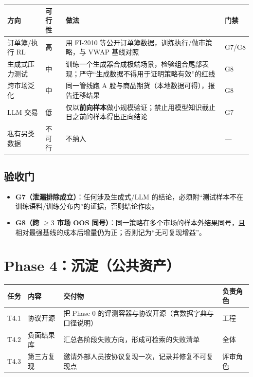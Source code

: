 \documentclass[11pt,a4paper]{ctexart}
\begin{document}
\begin{longtable}{@{}>{\raggedright\arraybackslash}p{3.0cm}>{\raggedright\arraybackslash}p{1.6cm}>{\raggedright\arraybackslash}p{7.2cm}>{\raggedright\arraybackslash}p{1.9cm}@{}}
\toprule
方向 & 可行性 & 做法 & 门禁 \\
\midrule
\endhead
订单簿/执行 RL & 高 & 用 FI-2010 等公开订单簿数据，训练执行/做市策略，与 VWAP 基线对照 & G7/G8 \\
生成式压力测试 & 中 & 训练一个生成器合成极端场景，检验组合尾部表现；严守“生成数据不得用于证明策略有效”的红线 & G8 \\
跨市场泛化 & 中 & 同一管线跑 A 股与商品期货（本地数据可得），报告迁移结果 & G8 \\
LLM 交易 & 低 & 仅以\textbf{前向样本}做小规模验证；禁止用模型知识截止日之前的样本得出正向结论 & G7 \\
私有另类数据 & 不可行 & 不纳入 & — \\
\bottomrule
\end{longtable}

\subsection{验收门}

\begin{itemize}
  \item \textbf{G7（泄漏排除成立）}：任何涉及生成式/LLM 的结论，必须附“测试样本不在训练语料/训练分布内”的证据，否则结论作废。
  \item \textbf{G8（跨 $\geq 3$ 市场 OOS 同号）}：同一策略在多个市场的样本外结果同号，且相对最强基线的成本后增量仍为正；否则记为“无可复现增益”。
\end{itemize}

\section{Phase 4：沉淀（公共资产）}

\begin{longtable}{@{}>{\raggedright\arraybackslash}p{1.0cm}>{\raggedright\arraybackslash}p{4.4cm}>{\raggedright\arraybackslash}p{5.6cm}>{\raggedright\arraybackslash}p{2.6cm}@{}}
\toprule
任务 & 内容 & 交付物 & 负责角色 \\
\midrule
\endhead
T4.1 & 协议开源 & 把 Phase 0 的评测容器与协议开源（含数据字典与口径说明） & 工程 \\
T4.2 & 负面结果库 & 汇总各阶段失败方向，形成可检索的失败清单 & 全体 \\
T4.3 & 第三方复现 & 邀请外部人员按协议复现一次，记录并修复不可复现点 & 评审角色 \\
\bottomrule
\end{longtable}
\end{document}
